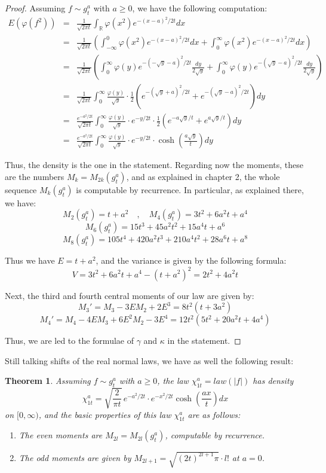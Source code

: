 \documentclass[12pt]{amsbook}
\newtheorem{theorem}{Theorem}[chapter]
\begin{document}
\begin{proof}
Assuming $f\sim g_t^a$ with $a\geq0$, we have the following computation:
\begin{eqnarray*}
E(\varphi(f^2))
&=&\frac{1}{\sqrt{2\pi t}}\int_\mathbb R\varphi(x^2)e^{-(x-a)^2/2t}dx\\
&=&\frac{1}{\sqrt{2\pi t}}\left(\int_{-\infty}^0\varphi(x^2)e^{-(x-a)^2/2t}dx
+\int_0^\infty\varphi(x^2)e^{-(x-a)^2/2t}dx\right)\\
&=&\frac{1}{\sqrt{2\pi t}}\left(\int_0^\infty\varphi(y)e^{-(-\sqrt{y}-a)^2/2t}\frac{dy}{2\sqrt{y}}
+\int_0^\infty\varphi(y)e^{-(\sqrt{y}-a)^2/2t}\frac{dy}{2\sqrt{y}}\right)\\
&=&\frac{1}{\sqrt{2\pi t}}\int_0^\infty\frac{\varphi(y)}{\sqrt{y}}
\cdot\frac{1}{2}\left(e^{-(\sqrt{y}+a)^2/2t}+e^{-(\sqrt{y}-a)^2/2t}\right)dy\\
&=&\frac{e^{-a^2/2t}}{\sqrt{2\pi t}}\int_0^\infty\frac{\varphi(y)}{\sqrt{y}}\cdot e^{-y/2t}
\cdot\frac{1}{2}\left(e^{-a\sqrt{y}/t}+e^{a\sqrt{y}/t}\right)dy\\
&=&\frac{e^{-a^2/2t}}{\sqrt{2\pi t}}\int_0^\infty\frac{\varphi(y)}{\sqrt{y}}\cdot e^{-y/2t}
\cdot\cosh\left(\frac{a\sqrt{y}}{t}\right)dy
\end{eqnarray*}

Thus, the density is the one in the statement. Regarding now the moments, these are the numbers $M_k=M_{2k}(g_t^a)$, and as explained in chapter 2, the whole sequence $M_k(g_t^a)$ is computable by recurrence. In particular, as explained there, we have:
$$M_2(g_t^a)=t+a^2\quad,\quad M_4(g_t^a)=3t^2+6a^2t+a^4$$
$$M_6(g_t^a)=15t^3+45a^2t^2+15a^4t+a^6$$
$$M_8(g_t^a)=105t^4+420a^2t^3+210a^4t^2+28a^6t+a^8$$

Thus we have $E=t+a^2$, and the variance is given by the following formula:
$$V=3t^2+6a^2t+a^4-(t+a^2)^2=2t^2+4a^2t$$

Next, the third and fourth central moments of our law are given by:
$$M_3'=M_3-3EM_2+2E^3=8t^2(t+3a^2)$$
$$M_4'=M_4-4EM_3+6E^2M_2-3E^4=12t^2(5t^2+20a^2t+4a^4)$$

Thus, we are led to the formulae of $\gamma$ and $\kappa$ in the statement.
\end{proof}

Still talking shifts of the real normal laws, we have as well the following result:

\begin{theorem}
Assuming $f\sim g_t^a$ with $a\geq0$, the law $\chi_{1t}^a=law(|f|)$ has density
$$\chi_{1t}^a=\sqrt{\frac{2}{\pi t}}\,e^{-a^2/2t}\cdot e^{-x^2/2t}\cosh\left(\frac{ax}{t}\right)dx$$
on $[0,\infty)$, and the basic properties of this law $\chi_{1t}^a$ are as follows:
\begin{enumerate}
\item The even moments are $M_{2l}=M_{2l}(g_t^a)$, computable by recurrence. 

\item The odd moments are given by $M_{2l+1}=\sqrt{(2t)^{2l+1}\pi}\cdot l!$ at $a=0$.
\end{enumerate}
\end{theorem}
\end{document}
